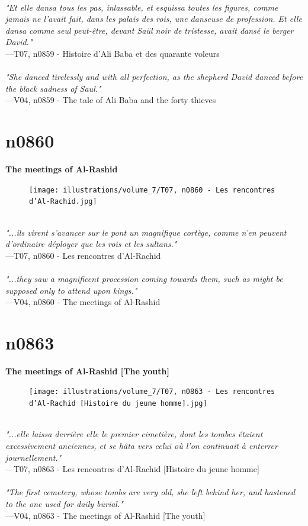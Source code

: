\documentclass[../Carre_nights.tex]{subfiles}
\begin{document}
\textit{\\
"Et elle dansa tous les pas, inlassable, et esquissa toutes les figures, comme jamais ne l’avait fait, dans les palais des rois, une danseuse de profession. Et elle dansa comme seul peut-être, devant Saül noir de tristesse, avait dansé le berger David."} \\
—T07, n0859 - Histoire d'Ali Baba et des quarante voleurs \\~\\
\textit{"She danced tirelessly and with all perfection, as the shepherd David danced before the black sadness of Saul."} \\
—V04, n0859 - The tale of Ali Baba and the forty thieves

\newpage

\section{n0860}
\textbf{\Large{The meetings of Al-Rashid}} \\

\begin{figure}[ht]
\centering
\texttt{[image: illustrations/volume\_7/T07, n0860 - Les rencontres d’Al-Rachid.jpg]}
\end{figure}

\textit{\\
"...ils virent s’avancer sur le pont un magnifique cortège, comme n’en peuvent d’ordinaire déployer que les rois et les sultans."} \\
—T07, n0860 - Les rencontres d’Al-Rachid \\~\\
\textit{"...they saw a magnificent procession coming towards them, such as might be supposed only to attend upon kings."} \\
—V04, n0860 - The meetings of Al-Rashid

\newpage

\section{n0863}
\textbf{\Large{The meetings of Al-Rashid [The youth]}} \\

\begin{figure}[ht]
\centering
\texttt{[image: illustrations/volume\_7/T07, n0863 - Les rencontres d’Al-Rachid [Histoire du jeune homme].jpg]}
\end{figure}

\textit{\\
"...elle laissa derrière elle le premier cimetière, dont les tombes étaient excessivement anciennes, et se hâta vers celui où l’on continuait à enterrer journellement."} \\
—T07, n0863 - Les rencontres d’Al-Rachid [Histoire du jeune homme] \\~\\
\textit{"The first cemetery, whose tombs are very old, she left behind her, and hastened to the one used for daily burial."} \\
—V04, n0863 - The meetings of Al-Rashid [The youth]
\end{document}
